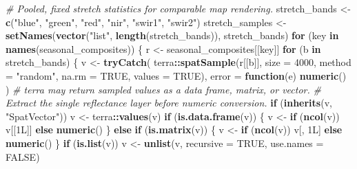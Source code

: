 \documentclass[
]{article}
\newenvironment{Shaded}{\begin{snugshade}}{\end{snugshade}}
\newcommand{\AttributeTok}[1]{\textcolor[rgb]{0.13,0.29,0.53}{#1}}
\newcommand{\CommentTok}[1]{\textcolor[rgb]{0.56,0.35,0.01}{\textit{#1}}}
\newcommand{\ConstantTok}[1]{\textcolor[rgb]{0.56,0.35,0.01}{#1}}
\newcommand{\ControlFlowTok}[1]{\textcolor[rgb]{0.13,0.29,0.53}{\textbf{#1}}}
\newcommand{\DataTypeTok}[1]{\textcolor[rgb]{0.13,0.29,0.53}{#1}}
\newcommand{\DecValTok}[1]{\textcolor[rgb]{0.00,0.00,0.81}{#1}}
\newcommand{\FunctionTok}[1]{\textcolor[rgb]{0.13,0.29,0.53}{\textbf{#1}}}
\newcommand{\NormalTok}[1]{#1}
\newcommand{\OtherTok}[1]{\textcolor[rgb]{0.56,0.35,0.01}{#1}}
\newcommand{\SpecialCharTok}[1]{\textcolor[rgb]{0.81,0.36,0.00}{\textbf{#1}}}
\newcommand{\StringTok}[1]{\textcolor[rgb]{0.31,0.60,0.02}{#1}}
\begin{document}
\begin{Shaded}
\begin{Highlighting}[]
\CommentTok{\# Pooled, fixed stretch statistics for comparable map rendering.}
\NormalTok{stretch\_bands }\OtherTok{\textless{}{-}} \FunctionTok{c}\NormalTok{(}\StringTok{"blue"}\NormalTok{, }\StringTok{"green"}\NormalTok{, }\StringTok{"red"}\NormalTok{, }\StringTok{"nir"}\NormalTok{, }\StringTok{"swir1"}\NormalTok{, }\StringTok{"swir2"}\NormalTok{)}
\NormalTok{stretch\_samples }\OtherTok{\textless{}{-}} \FunctionTok{setNames}\NormalTok{(}\FunctionTok{vector}\NormalTok{(}\StringTok{"list"}\NormalTok{, }\FunctionTok{length}\NormalTok{(stretch\_bands)), stretch\_bands)}
\ControlFlowTok{for}\NormalTok{ (key }\ControlFlowTok{in} \FunctionTok{names}\NormalTok{(seasonal\_composites)) \{}
\NormalTok{  r }\OtherTok{\textless{}{-}}\NormalTok{ seasonal\_composites[[key]]}
  \ControlFlowTok{for}\NormalTok{ (b }\ControlFlowTok{in}\NormalTok{ stretch\_bands) \{}
\NormalTok{    v }\OtherTok{\textless{}{-}} \FunctionTok{tryCatch}\NormalTok{(}
\NormalTok{      terra}\SpecialCharTok{::}\FunctionTok{spatSample}\NormalTok{(r[[b]], }\AttributeTok{size =} \DecValTok{4000}\NormalTok{, }\AttributeTok{method =} \StringTok{"random"}\NormalTok{, }\AttributeTok{na.rm =} \ConstantTok{TRUE}\NormalTok{, }\AttributeTok{values =} \ConstantTok{TRUE}\NormalTok{),}
      \AttributeTok{error =} \ControlFlowTok{function}\NormalTok{(e) }\FunctionTok{numeric}\NormalTok{()}
\NormalTok{    )}
    \CommentTok{\# terra may return sampled values as a data frame, matrix, or vector.}
    \CommentTok{\# Extract the single reflectance layer before numeric conversion.}
    \ControlFlowTok{if}\NormalTok{ (}\FunctionTok{inherits}\NormalTok{(v, }\StringTok{"SpatVector"}\NormalTok{)) v }\OtherTok{\textless{}{-}}\NormalTok{ terra}\SpecialCharTok{::}\FunctionTok{values}\NormalTok{(v)}
    \ControlFlowTok{if}\NormalTok{ (}\FunctionTok{is.data.frame}\NormalTok{(v)) \{}
\NormalTok{      v }\OtherTok{\textless{}{-}} \ControlFlowTok{if}\NormalTok{ (}\FunctionTok{ncol}\NormalTok{(v)) v[[}\DecValTok{1}\DataTypeTok{L}\NormalTok{]] }\ControlFlowTok{else} \FunctionTok{numeric}\NormalTok{()}
\NormalTok{    \} }\ControlFlowTok{else} \ControlFlowTok{if}\NormalTok{ (}\FunctionTok{is.matrix}\NormalTok{(v)) \{}
\NormalTok{      v }\OtherTok{\textless{}{-}} \ControlFlowTok{if}\NormalTok{ (}\FunctionTok{ncol}\NormalTok{(v)) v[, }\DecValTok{1}\DataTypeTok{L}\NormalTok{] }\ControlFlowTok{else} \FunctionTok{numeric}\NormalTok{()}
\NormalTok{    \}}
    \ControlFlowTok{if}\NormalTok{ (}\FunctionTok{is.list}\NormalTok{(v)) v }\OtherTok{\textless{}{-}} \FunctionTok{unlist}\NormalTok{(v, }\AttributeTok{recursive =} \ConstantTok{TRUE}\NormalTok{, }\AttributeTok{use.names =} \ConstantTok{FALSE}\NormalTok{)}

\end{Highlighting}
\end{Shaded}
\end{document}
